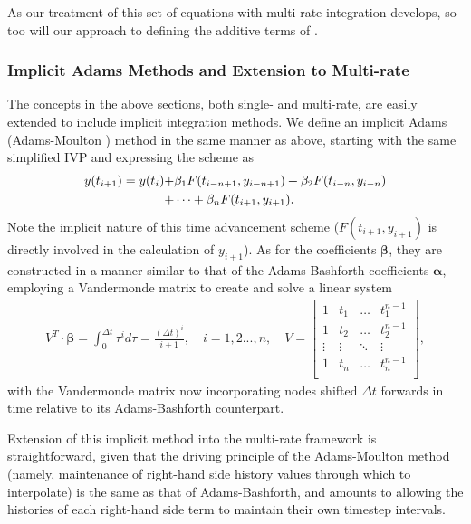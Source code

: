 As our treatment of this set of equations with multi-rate integration develops,
so too will our approach to defining the additive terms of .

\subsubsection{Implicit Adams Methods and Extension to Multi-rate}

The concepts in the above sections, both single- and multi-rate, are
easily extended to include implicit integration methods. We define an
implicit Adams (Adams-Moulton \cite{moulton1926new}) method in the same manner as above, starting
with the same simplified IVP  and expressing the scheme as
\begin{align}
y(t_{i+1}) = y(t_{i}) +& \beta_{1}F(t_{i-n+1},y_{i-n+1}) + \beta_{2}F(t_{i-n},y_{i-n}) \notag \\
+& \cdots + \beta_{n}F(t_{i+1},y_{i+1}). \label{eq:am_general}
\end{align}
Note the implicit nature of this time advancement scheme ($F(t_{i+1}, y_{i+1})$ is
directly involved in the calculation of $y_{i+1}$). As for the coefficients
$\boldsymbol{\beta}$, they are constructed in a manner similar to that of
the Adams-Bashforth coefficients $\boldsymbol{\alpha}$, employing a Vandermonde matrix to
create and solve a linear system
\begin{align}
V^{T} \cdot \boldsymbol{\beta} = \int_0^{\Delta t} \tau^{i} d\tau = \frac{(\Delta t)^{i}}{i+1}, \quad i = 1,2...,n, \quad V = \begin{bmatrix}
    1 & t_{1} &  \hdots   & t_{1}^{n-1}  \\
    1 & t_{2} & \hdots &  t_{2}^{n-1} \\
      \vdots  & \vdots  &  \ddots   &  \vdots   \\
       1 &   t_{n}  &  \hdots  & t_{n}^{n-1} \\
        \end{bmatrix}, \label{eq:vandermonde_implicit}
\end{align}
with the Vandermonde matrix now incorporating nodes shifted $\Delta t$ forwards
in time relative to its Adams-Bashforth counterpart.

Extension of this implicit method into the multi-rate framework is
straightforward, given that the driving principle of the Adams-Moulton
method (namely, maintenance of right-hand side history values through
which to interpolate) is the same as that of Adams-Bashforth, and amounts to
allowing the histories of each right-hand side term to maintain their
own timestep intervals.

